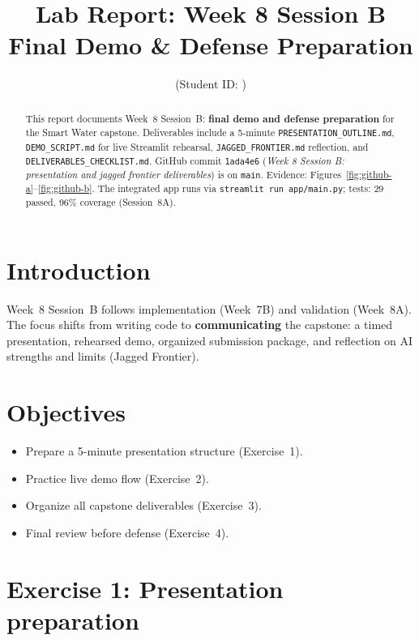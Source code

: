 \documentclass[11pt,a4paper]{article}
\title{Lab Report: Week 8 Session B\\Final Demo \& Defense Preparation}
\author{\studentname \quad (Student ID: \studentid)}
\date{\reportdate}
\begin{document}
\maketitle

\begin{abstract}
This report documents Week~8 Session~B: \textbf{final demo and defense preparation} for the Smart Water capstone. Deliverables include a 5-minute \texttt{PRESENTATION\_OUTLINE.md}, \texttt{DEMO\_SCRIPT.md} for live Streamlit rehearsal, \texttt{JAGGED\_FRONTIER.md} reflection, and \texttt{DELIVERABLES\_CHECKLIST.md}. GitHub commit \texttt{1ada4e6} (\emph{Week 8 Session B: presentation and jagged frontier deliverables}) is on \texttt{main}. Evidence: Figures~\ref{fig:github-a}--\ref{fig:github-b}. The integrated app runs via \texttt{streamlit run app/main.py}; tests: 29 passed, 96\% coverage (Session~8A).
\end{abstract}

\section{Introduction}
Week~8 Session~B follows implementation (Week~7B) and validation (Week~8A). The focus shifts from writing code to \textbf{communicating} the capstone: a timed presentation, rehearsed demo, organized submission package, and reflection on AI strengths and limits (Jagged Frontier).

\section{Objectives}
\begin{itemize}[noitemsep]
  \item Prepare a 5-minute presentation structure (Exercise~1).
  \item Practice live demo flow (Exercise~2).
  \item Organize all capstone deliverables (Exercise~3).
  \item Final review before defense (Exercise~4).
\end{itemize}

\section{Exercise 1: Presentation preparation}
\end{document}
